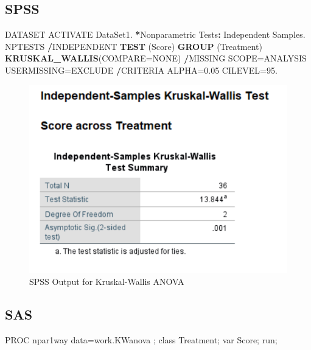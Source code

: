 \documentclass[
]{book}
\newenvironment{Shaded}{\begin{snugshade}}{\end{snugshade}}
\newcommand{\DataTypeTok}[1]{\textcolor[rgb]{0.13,0.29,0.53}{#1}}
\newcommand{\FloatTok}[1]{\textcolor[rgb]{0.00,0.00,0.81}{#1}}
\newcommand{\KeywordTok}[1]{\textcolor[rgb]{0.13,0.29,0.53}{\textbf{#1}}}
\newcommand{\NormalTok}[1]{#1}
\newcommand{\OperatorTok}[1]{\textcolor[rgb]{0.81,0.36,0.00}{\textbf{#1}}}
\newcommand{\StringTok}[1]{\textcolor[rgb]{0.31,0.60,0.02}{#1}}
\begin{document}
\hypertarget{spss-2}{%
\subsection{SPSS}\label{spss-2}}

\begin{Shaded}
\begin{Highlighting}[]
\NormalTok{DATASET ACTIVATE DataSet1.}
\OperatorTok{*}\NormalTok{Nonparametric Tests}\OperatorTok{:}\StringTok{ }\NormalTok{Independent Samples. }
\NormalTok{NPTESTS }
  \OperatorTok{/}\NormalTok{INDEPENDENT }\KeywordTok{TEST}\NormalTok{ (Score) }\KeywordTok{GROUP}\NormalTok{ (Treatment) }\KeywordTok{KRUSKAL_WALLIS}\NormalTok{(}\DataTypeTok{COMPARE=}\NormalTok{NONE) }
  \OperatorTok{/}\NormalTok{MISSING SCOPE=ANALYSIS USERMISSING=EXCLUDE}
  \OperatorTok{/}\NormalTok{CRITERIA ALPHA=}\FloatTok{0.05}\NormalTok{  CILEVEL=}\FloatTok{95.}
\end{Highlighting}
\end{Shaded}

\begin{figure}[!h]
\includegraphics{Screenshots/Kruskal-Wallis ANOVA/kwaSPSS} \caption{\label{fig:kwaSPSS}SPSS Output for Kruskal-Wallis ANOVA}\label{fig:kwaSPSS}
\end{figure}

\hypertarget{sas-2}{%
\subsection{SAS}\label{sas-2}}

\begin{Shaded}
\begin{Highlighting}[]
\NormalTok{PROC npar1way data=work.KWanova ;}
\NormalTok{class Treatment;}
\NormalTok{var Score;}
\NormalTok{run;}
\end{Highlighting}
\end{Shaded}
\end{document}
